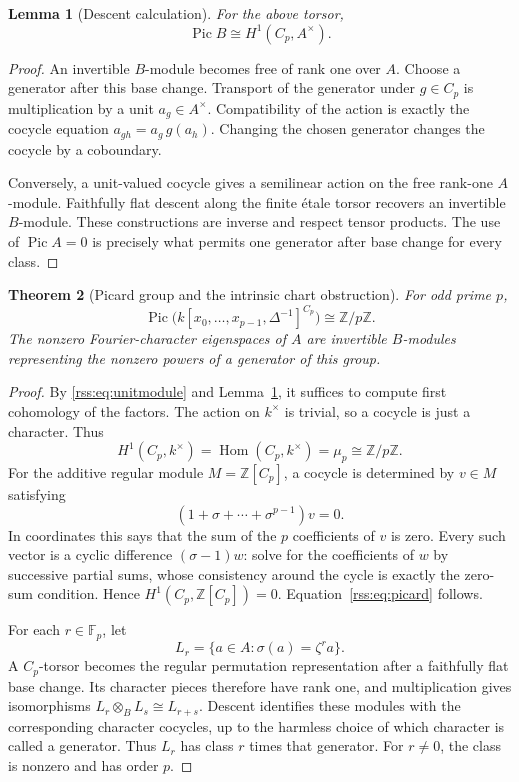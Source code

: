\documentclass[11pt,a4paper]{article}
\newtheorem{theorem}{Theorem}[section]
\newtheorem{lemma}[theorem]{Lemma}
\theoremstyle{definition}
\theoremstyle{remark}
\newcommand{\Z}{\mathbb Z}
\newcommand{\F}{\mathbb F}
\newcommand{\Pic}{\operatorname{Pic}}
\begin{document}
\begin{lemma}[Descent calculation]\label{rss:lem:descent}
For the above torsor,
\[
 \Pic B\cong H^1(C_p,A^\times).
\]
\end{lemma}
\begin{proof}
An invertible $B$-module becomes free of rank one over $A$.
Choose a generator after this base change. Transport of the generator
under $g\in C_p$ is multiplication by a unit $a_g\in A^\times$.
Compatibility of the action is exactly the cocycle equation
$a_{gh}=a_g\,g(a_h)$. Changing the chosen generator changes the cocycle
by a coboundary.

Conversely, a unit-valued cocycle gives a semilinear action on the free
rank-one $A$-module. Faithfully flat descent along the finite \'etale torsor
recovers an invertible $B$-module. These constructions are inverse and
respect tensor products. The use of $\Pic A=0$ is precisely what permits
one generator after base change for every class.
\end{proof}

\begin{theorem}[Picard group and the intrinsic chart obstruction]\label{rss:thm:picard}
For odd prime $p$,
\begin{equation}
 \Pic\bigl(k[x_0,\ldots,x_{p-1},\Delta^{-1}]^{C_p}\bigr)
 \cong\Z/p\Z.
 \label{rss:eq:picard}
\end{equation}
The nonzero Fourier-character eigenspaces of $A$ are invertible
$B$-modules representing the nonzero powers of a generator of this group.
\end{theorem}
\begin{proof}
By \eqref{rss:eq:unitmodule} and Lemma~\ref{rss:lem:descent}, it suffices to
compute first cohomology of the factors. The action on $k^\times$ is
trivial, so a cocycle is just a character. Thus
\[
 H^1(C_p,k^\times)=\operatorname{Hom}(C_p,k^\times)=\mu_p\cong\Z/p\Z.
\]
For the additive regular module $M=\Z[C_p]$, a cocycle is determined by
$v\in M$ satisfying
\[
 (1+\sigma+\cdots+\sigma^{p-1})v=0.
\]
In coordinates this says that the sum of the $p$ coefficients of $v$ is
zero. Every such vector is a cyclic difference $(\sigma-1)w$: solve for
the coefficients of $w$ by successive partial sums, whose consistency
around the cycle is exactly the zero-sum condition. Hence
$H^1(C_p,\Z[C_p])=0$. Equation~\eqref{rss:eq:picard} follows.

For each $r\in\F_p$, let
\[
 L_r=\{a\in A:\sigma(a)=\zeta^r a\}.
\]
A $C_p$-torsor becomes the regular permutation representation after a
faithfully flat base change. Its character pieces therefore have rank
one, and multiplication gives isomorphisms
$L_r\otimes_B L_s\cong L_{r+s}$. Descent identifies these modules with
the corresponding character cocycles, up to the harmless choice of which
character is called a generator. Thus $L_r$ has class $r$ times that
generator. For $r\neq0$, the class is nonzero and has order $p$.
\end{proof}
\end{document}
